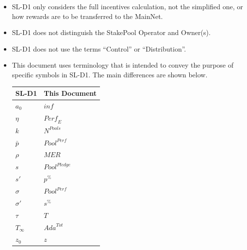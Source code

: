 \documentclass[11pt,a4paper,dvipsnames,twosided,final]{article}
\begin{document}
\begin{itemize}
\item
  SL-D1 only considers the full incentives calculation, not the simplified one, or how
  rewards are to be transferred to the MainNet.
\item
  SL-D1 does not distinguish the StakePool Operator and Owner(s).
\item
  SL-D1 does not use the terms ``Control'' or ``Distribution''.
\item
  This document uses terminology that is intended to convey the purpose of specific symbols
  in SL-D1.  The main differences are shown below.

  \begin{center}
  \begin{tabular}{||l|l||}\hline\hline
    \textbf{SL-D1} & \textbf{This Document} \\ \hline
  $a_0$ & $\textit{inf}$ \\ \hline
  $\eta$ & $\textit{Perf}_E$ \\ \hline
  $k$ & $N^{\textit{Pools}}$ \\ \hline
  $\bar{p}$  & $\textit{Pool}^{\textit{Perf}}$ \\ \hline
  $\rho$ & $\textit{MER}$ \\ \hline
  $s$  & $\textit{Pool}^{\textit{Pledge}}$ \\ \hline
  $s'$  & $\textit{p}^{\%}$ \\ \hline
  $\sigma$ & $\textit{Pool}^{\textit{Perf}}$ \\
  $\sigma'$  & $\textit{s}^{\%}$ \\ \hline
  $\tau$  & $T$ \\ \hline
  $T_{\infty}$  & $\textit{Ada}^{Tot}$ \\ \hline
  $z_0$ & $z$ \\ \hline
\hline
\end{tabular}
\end{center}
\end{itemize}
\end{document}
